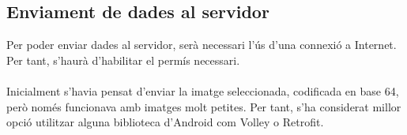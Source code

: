 	\subsection{Enviament de dades al servidor}
		Per poder enviar dades al servidor, serà necessari l'ús d'una connexió a Internet. Per tant, s'haurà d'habilitar el permís necessari.\\\\
		Inicialment s'havia pensat d'enviar la imatge seleccionada, codificada en base 64, però només funcionava amb imatges molt petites. Per tant, s'ha considerat millor opció utilitzar alguna biblioteca
		d'Android com Volley o Retrofit.
